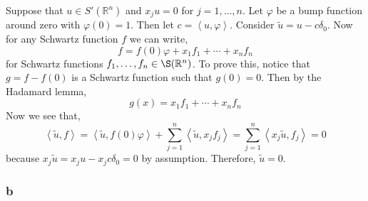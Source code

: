 \documentclass[12pt]{article}
\newcommand{\inner}[2]{\left< #1, #2 \right>}
\newcommand{\R}{\mathbb{R}}
\begin{document}
Suppose that $u \in S'(\R^n)$ and $x_j u = 0$ for $j = 1, \dots, n$. Let $\varphi$ be a bump function around zero with $\varphi(0) = 1$. Then let $c = \inner{u}{\varphi}$. Consider $\tilde{u} = u - c \delta_0$. Now for any Schwartz function $f$ we can write,
\[ f = f(0) \varphi + x_1 f_1 + \cdots + x_n f_n \]
for Schwartz functions $f_1, \dots, f_n \in \S(\R^n)$. To prove this, notice that $g = f - f(0)$ is a Schwartz function such that $g(0) = 0$. Then by the Hadamard lemma,
\[ g(x) = x_1 f_1 + \cdots + x_n f_n \]
Now we see that,
\[ \inner{\tilde{u}}{f} = \inner{\tilde{u}}{f(0) \varphi} + \sum_{j = 1}^n \inner{\tilde{u}}{x_j f_j} = \sum_{j = 1}^n \inner{x_j \tilde{u}}{f_j} = 0 \]
because $x_j \tilde{u} = x_j u - x_j c \delta_0 = 0$ by assumption. Therefore, $\tilde{u} = 0$.

\subsubsection{b}
\end{document}
